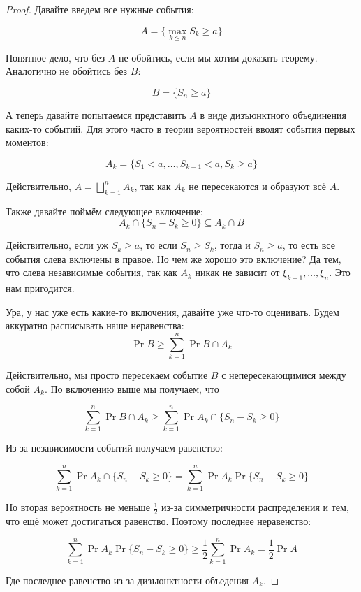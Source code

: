 \begin{proof}
  Давайте введем все нужные события:

  \[
    A = \{\max\limits_{k \leq n} S_k \geq a\}
  \]

  Понятное дело, что без $A$ не обойтись, если мы хотим доказать теорему. Аналогично
  не обойтись без $B$:

  \[
    B = \{S_n \geq a\}
  \]

  А теперь давайте попытаемся представить $A$ в виде дизъюнктного объединения
  каких-то событий. Для этого часто в теории вероятностей вводят события первых
  моментов:

  \[
    A_k = \{S_1 < a, \ldots, S_{k - 1} < a, S_k \geq a\}
  \]

  Действительно, $A = \bigsqcup\limits_{k = 1}^n A_k$, так как
  $A_k$ не пересекаются и образуют всё $A$.

  Также давайте поймём следующее включение:
  \[
    A_k \cap \{S_n - S_k \geq 0\} \subseteq A_k \cap B
  \]

  Действительно, если уж $S_k \geq a$, то если $S_n \geq S_k$, тогда и
  $S_n \geq a$, то есть все события слева включены в правое. Но чем же хорошо
  это включение? Да тем, что слева независимые события, так как
  $A_k$ никак не зависит от $\xi_{k + 1}, \ldots, \xi_n$. Это нам пригодится.

  Ура, у нас уже
  есть какие-то включения, давайте уже что-то оценивать. Будем аккуратно
  расписывать наше неравенства:
  \[
    \Pr{B} \geq \sum\limits_{k = 1}^n \Pr{B \cap A_k}
  \]

  Действительно, мы просто пересекаем событие $B$ с непересекающимися между
  собой $A_k$. По включению выше мы получаем, что 

  \[
    \sum\limits_{k = 1}^n \Pr{B \cap A_k} \geq \sum\limits_{k = 1}^n \Pr{A_k \cap \{S_n - S_k \geq 0\}}
  \]

  Из-за независимости событий получаем равенство:

  \[
    \sum\limits_{k = 1}^n \Pr{A_k \cap \{S_n - S_k \geq 0\}} = 
    \sum\limits_{k = 1}^n \Pr{A_k} \Pr{\{S_n - S_k \geq 0\}}
  \]

  Но вторая вероятность не меньше $\frac12$ из-за симметричности распределения
  и тем, что ещё может достигаться равенство. Поэтому последнее неравенство:

  \[
    \sum\limits_{k = 1}^n \Pr{A_k} \Pr{\{S_n - S_k \geq 0\}} \geq
    \frac12\sum\limits_{k = 1}^n \Pr{A_k} = \frac12 \Pr{A}
  \]

  Где последнее равенство из-за дизъюнктности объедения $A_k$.
\end{proof}

